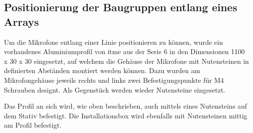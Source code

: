 \subsection{Positionierung der Baugruppen entlang eines Arrays}

Um die Mikrofone entlang einer Linie positionieren zu können, wurde ein vorhandenes Aluminiumprofil von itme aus der Serie 6 in den Dimensionen 1100 x 30 x 30 eingesetzt, auf welchem die Gehäuse der Mikrofone mit Nutensteinen in definierten Abständen montiert werden können. Dazu wurden am Mikrofongehäuse jeweils rechts und links zwei Befestigungspunkte für M4 Schrauben designt. Als Gegenstück werden wieder Nutensteine eingesetzt.

Das Profil an sich wird, wie oben beschrieben, auch mittels eines Nutensteins auf dem Stativ befestigt. Die Installationsbox wird ebenfalls mit Nutensteinen mittig am Profil befestigt.

\newpage